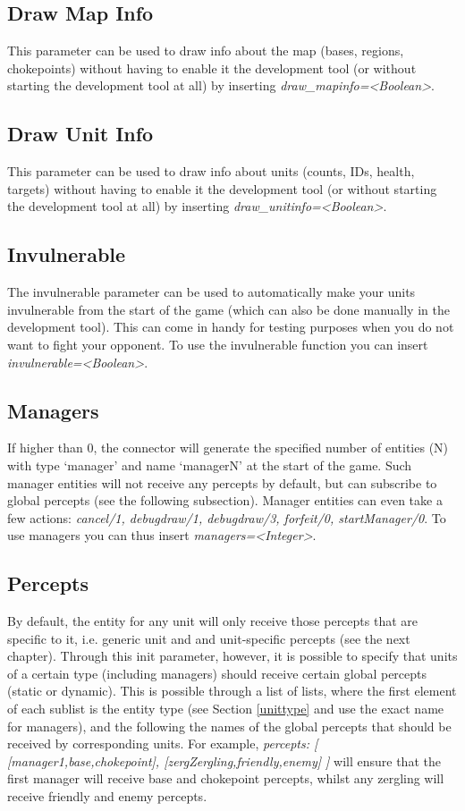 \subsection{Draw Map Info}
\label{draw map info}
This parameter can be used to draw info about the map (bases, regions, chokepoints) without having to enable it the development tool (or without starting the development tool at all) by inserting \textit{draw\_mapinfo=<Boolean>}.

\subsection{Draw Unit Info}
\label{draw unit info}
This parameter can be used to draw info about units (counts, IDs, health, targets) without having to enable it the development tool (or without starting the development tool at all) by inserting \textit{draw\_unitinfo=<Boolean>}.

\subsection{Invulnerable}
\label{invulnerable}
The invulnerable parameter can be used to automatically make your units invulnerable from the start of the game (which can also be done manually in the development tool). This can come in handy for testing purposes when you do not want to fight your opponent. To use the invulnerable function you can insert \textit{invulnerable=<Boolean>}.

\subsection{Managers}
\label{managers}
If higher than 0, the connector will generate the specified number of entities (N) with type `manager' and name `managerN' at the start of the game. Such manager entities will not receive any percepts by default, but can subscribe to global percepts (see the following subsection). Manager entities can even take a few actions: \textit{cancel/1, debugdraw/1, debugdraw/3, forfeit/0, startManager/0}. To use managers you can thus insert \textit{managers=<Integer>}.

\pagebreak
\subsection{Percepts}
\label{percepts}
By default, the entity for any unit will only receive those percepts that are specific to it, i.e. generic unit and and unit-specific percepts (see the next chapter). Through this init parameter, however, it is possible to specify that units of a certain type (including managers) should receive certain global percepts (static or dynamic).  This is possible through a list of lists, where the first element of each sublist is the entity type (see Section \ref{unittype} and use the exact name for managers), and the following the names of the global percepts that should be received by corresponding units. For example, \textit{percepts: [ [manager1,base,chokepoint], [zergZergling,friendly,enemy] ]} will ensure that the first manager will receive base and chokepoint percepts, whilst any zergling will receive friendly and enemy percepts.

